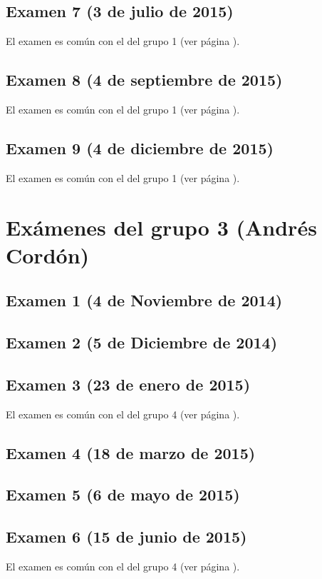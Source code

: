 \documentclass[a4paper,12pt,twoside]{book}
\begin{document}
\subsection{Examen 7 (3 de julio de 2015)}
El examen es común con el del grupo 1 (ver página \pageref{examen_14_15_5_7}).
\subsection{Examen 8 (4 de septiembre de 2015)}
El examen es común con el del grupo 1 (ver página \pageref{examen_14_15_5_8}).
\subsection{Examen 9 (4 de diciembre de 2015)}
El examen es común con el del grupo 1 (ver página \pageref{examen_14_15_5_9}).

\section{Exámenes del grupo 3 (Andrés Cordón)}
\subsection{Examen 1 (4 de Noviembre de 2014)}
\subsection{Examen 2 (5 de Diciembre de 2014)}
\subsection{Examen 3 (23 de enero de 2015)}
El examen es común con el del grupo 4 (ver página \pageref{examen_14_15_4_3}).
\subsection{Examen 4 (18 de marzo de 2015)}
\subsection{Examen 5 (6 de mayo de 2015)}
\subsection{Examen 6 (15 de junio de 2015)}
El examen es común con el del grupo 4 (ver página \pageref{examen_14_15_4_6}).
\end{document}
